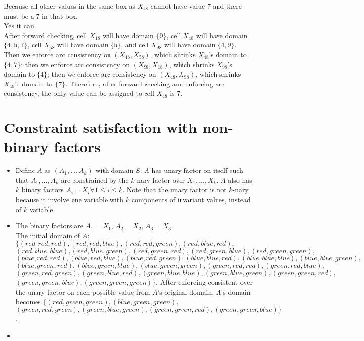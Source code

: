 \documentclass[11pt]{article}
\begin{document}
\begin{onehalfspace}
\begin{itemize}
	Because all other values in the same box as $X_{48}$ cannot have value $7$ and there must be a $7$ in that box.\\
	Yes it can.\\
	After forward checking, cell $X_{18}$ will have domain $\{9\}$, cell $X_{48}$ will have domain $\{4,5,7\}$, cell $X_{58}$ will have domain $\{5\}$, and cell $X_{98}$ will have domain $\{4,9\}$. Then we enforce arc consistency on $(X_{48},X_{58})$, which shrinks $X_{48}$'s domain to $\{4,7\}$; then we enforce arc consistency on $(X_{98},X_{18})$, which shrinks $X_{98}$'s domain to $\{4\}$; then we enforce arc consistency on $(X_{48},X_{98})$, which shrinks $X_{48}$'s domain to $\{7\}$. Therefore, after forward checking and enforcing arc consistency, the only value can be assigned to cell $X_{48}$ is $7$.
\end{itemize}
\section{Constraint satisfaction with non-binary factors}
\begin{itemize}
	\item
	Define $A$ as $(A_1,...,A_k)$ with domain $S$. $A$ has unary factor on itself such that $A_1,...,A_k$ are constrained by the $k$-nary factor over $X_1,...,X_k$. $A$ also has $k$ binary factors $A_i = X_i \forall 1 \leq i \leq k$. Note that the unary factor is not $k$-nary because it involve one variable with $k$ components of invariant values, instead of $k$ variable.\\
	\item
	 The binary factors are $A_1 = X_1$, $A_2 = X_2$, $A_3 = X_3$.\\
	 The initial domain of $A$: $\{(red,red,red),(red,red,blue),(red,red,green),(red,blue,red),$\\$(red,blue,blue),(red,blue,green),(red,green,red),(red,green,blue),(red,green,green),$\\$(blue,red,red),(blue,red,blue),(blue,red,green),(blue,blue,red),(blue,blue,blue),(blue,blue,green),$\\$(blue,green,red),(blue,green,blue),(blue,green,green),(green,red,red),(green,red,blue),$\\$(green,red,green),(green,blue,red),(green,blue,blue),(green,blue,green),(green,green,red),$\\$(green,green,blue),(green,green,green)\}$.
	 After enforcing consistent over the unary factor on each possible value from $A$'s original domain, $A$'s domain becomes $\{(red,green,green),(blue,green,green),$\\$(green,red,green),(green,blue,green),(green,green,red),(green,green,blue)\}$.
	 \item
	 

\end{itemize}
\end{onehalfspace}
\end{document}
